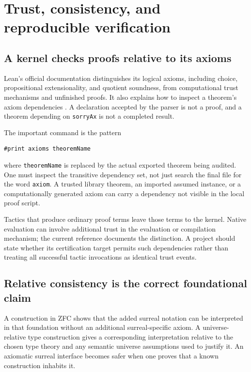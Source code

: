 \documentclass[11pt,letterpaper]{article}
\numberwithin{equation}{section}
\theoremstyle{definition}
\theoremstyle{remark}
\begin{document}
\section{Trust, consistency, and reproducible verification}\label{sec:trust}

\subsection{A kernel checks proofs relative to its axioms}
Lean's official documentation distinguishes its logical axioms, including choice, propositional extensionality, and quotient soundness, from computational trust mechanisms and unfinished proofs. It also explains how to inspect a theorem's axiom dependencies \cite{LeanAxioms,LeanValidation}. A declaration accepted by the parser is not a proof, and a theorem depending on \texttt{sorryAx} is not a completed result.

The important command is the pattern
\begin{samepage}
\begin{lstlisting}
#print axioms theoremName
\end{lstlisting}
\end{samepage}
where \texttt{theoremName} is replaced by the actual exported theorem being audited. One must inspect the transitive dependency set, not just search the final file for the word \texttt{axiom}. A trusted library theorem, an imported assumed instance, or a computationally generated axiom can carry a dependency not visible in the local proof script.

Tactics that produce ordinary proof terms leave those terms to the kernel. Native evaluation can involve additional trust in the evaluation or compilation mechanism; the current reference documents the distinction. A project should state whether its certification target permits such dependencies rather than treating all successful tactic invocations as identical trust events.

\subsection{Relative consistency is the correct foundational claim}
A construction in ZFC shows that the added surreal notation can be interpreted in that foundation without an additional surreal-specific axiom. A universe-relative type construction gives a corresponding interpretation relative to the chosen type theory and any semantic universe assumptions used to justify it. An axiomatic surreal interface becomes safer when one proves that a known construction inhabits it.
\end{document}
